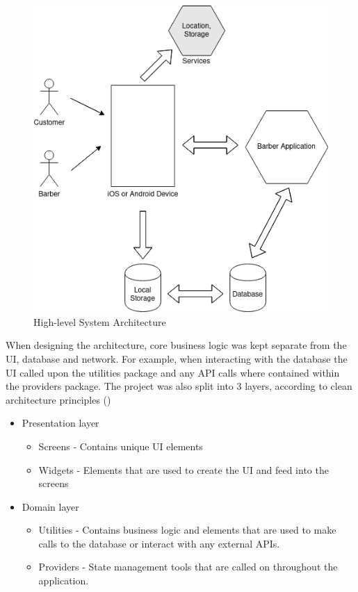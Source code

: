 \documentclass[12pt]{article}
\begin{document}
	\begin{figure}[H]
		\centering
		\includegraphics[scale=0.7]{images/system-architecture.png}
		\caption{High-level System Architecture}
		\label{fig:system-architecture}
	\end{figure}
	
	When designing the architecture, core business logic was kept separate from the UI, database and network. For example, when interacting with the database the UI called upon the utilities package and any API calls where contained within the providers package. The project was also split into 3 layers, according to clean architecture principles (\cite{martinRapidApplicationDevelopment1991})
	
	\begin{itemize}
		\item Presentation layer
		\begin{itemize}
			\item Screens - Contains unique UI elements
			\item Widgets - Elements that are used to create the UI and feed into the screens
		\end{itemize}
	\end{itemize}
	
	\begin{itemize}
		\item Domain layer
		\begin{itemize}
			\item Utilities - Contains business logic and elements that are used to make calls to the database or interact with any external APIs.
			\item Providers - State management tools that are called on throughout the application.
		\end{itemize}
	\end{itemize}
	
\end{document}
